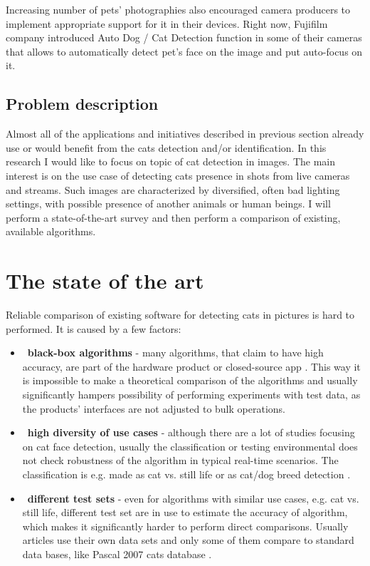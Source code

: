 \documentclass[hyperref]{acmtrans2e}
\begin{document}
Increasing number of pets' photographies also encouraged camera producers to implement appropriate support for it in their devices. Right now, Fujifilm company introduced Auto Dog / Cat Detection function \cite{FujiFilm:2009} in some of their cameras that allows to automatically detect pet's face on the image and put auto-focus on it. 
 
\subsection{Problem description}
Almost all of the applications and initiatives described in previous section already use or would benefit from the cats detection and/or identification. In this research I would like to focus on topic of cat detection in images. The main interest is on the use case of detecting cats presence in shots from live cameras and streams. Such images are characterized by  diversified, often bad lighting settings, with possible presence of another animals or human beings. I will perform a state-of-the-art survey and then perform a comparison of existing, available algorithms. 

\section{The state of the art}
Reliable comparison of existing software for detecting cats in pictures is hard to performed. It is caused by a few factors:
\begin{itemize}
\item~\textbf{black-box algorithms} - many algorithms, that claim to have high accuracy, are part of the hardware product \cite{CatFi:2015} or closed-source app \cite{PiP:2013}. This way it is impossible to make a theoretical comparison of the algorithms and usually significantly hampers possibility of performing experiments with test data, as the products' interfaces are not adjusted to bulk operations. 
\item~\textbf{high diversity of use cases} - although there are a lot of studies focusing on cat face detection, usually the classification or testing environmental does not check robustness of the algorithm in typical real-time scenarios. The classification is e.g. made as cat vs. still life \cite{features:2007,edges:2011} or as cat/dog breed detection \cite{breed:2012}.
\item~\textbf{different test sets} - even for algorithms with similar use cases, e.g. cat vs. still life, different test set are in use to estimate the accuracy of algorithm, which makes it significantly harder to perform direct comparisons. Usually articles use their own data sets \cite{breed:2012,features:2007,edges:2011} and only some of them compare to standard data bases, like Pascal 2007 cats database \cite{breed:2012}. 
\end{itemize}
\end{document}
